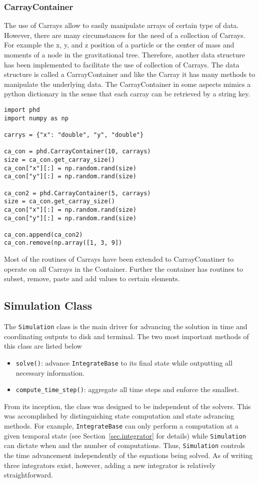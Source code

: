 \subsubsection{CarrayContainer}
The use of Carrays allow to easily manipulate arrays of certain type of data. However, there are
many circumstances for the need of a collection of Carrays. For example the x, y, and z position
of a particle or the center of mass and moments of a node in the gravitational tree. Therefore,
another data structure has been implemented to facilitate the use of collection of Carrays. The data
structure is called a CarrayContainer and like the Carray it has many methods to manipulate the
underlying data. The CarrayContainer in some aspects mimics a python dictionary in the sense
that each carray can be retrieved by a string key.
\begin{lstlisting}
import phd
import numpy as np

carrys = {"x": "double", "y", "double"}

ca_con = phd.CarrayContainer(10, carrays)
size = ca_con.get_carray_size()
ca_con["x"][:] = np.random.rand(size)
ca_con["y"][:] = np.random.rand(size)

ca_con2 = phd.CarrayContainer(5, carrays)
size = ca_con.get_carray_size()
ca_con["x"][:] = np.random.rand(size)
ca_con["y"][:] = np.random.rand(size)

ca_con.append(ca_con2)
ca_con.remove(np.array([1, 3, 9])
\end{lstlisting}
Most of the routines of Carrays have been extended to CarrayConatiner to operate on
all Carrays in the Container. Further the container has routines to subset, remove, paste
and add values to certain elements.

\subsection{Simulation Class}
The \lstinline{Simulation} class is the main driver for advancing the solution in time
and coordinating outputs to disk and terminal. The two most important methods of this
class are listed below
\begin{itemize}
    \item \lstinline{solve()}: advance \lstinline{IntegrateBase} to its final state while
        outputting all necessary information. 
    \item \lstinline{compute_time_step()}: aggregate all time steps and enforce the smallest.
\end{itemize}
From its inception, the class was designed to be independent of the solvers. This was 
accomplished by distinguishing state computation and state advancing methods. For example,
\lstinline{IntegrateBase} can only perform a computation at a given temporal state 
(see Section~\ref{sec.integrator} for details) while \lstinline{Simulation} can
dictate when and the number of computations. Thus, \lstinline{Simulation} controls the
time advancement independently of the equations being solved. As of writing three integrators
exist, however, adding a new integrator is relatively straightforward.

